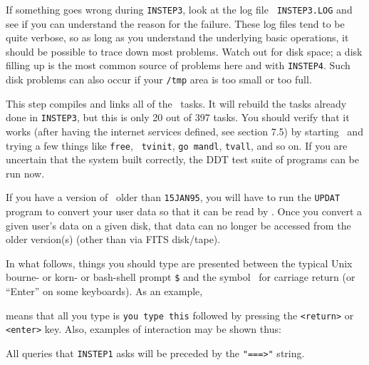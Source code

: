 If something goes wrong during {\tt INSTEP3}, look at the log file {\tt
INSTEP3.LOG} and see if you can understand the reason for the failure.
These log files tend to be quite verbose, so as long as you understand
the underlying basic operations, it should be possible to trace down
most problems.  Watch out for disk space; a disk filling up is the most
common source of problems here and with {\tt INSTEP4}.  Such disk
problems can also occur if your {\tt /tmp} area is too small or too
full.

\medskip{}

This step compiles and links all of the \aips\ tasks.  It will rebuild
the tasks already done in {\tt INSTEP3}, but this is only 20 out of
397 tasks.  You should verify that it works (after having the internet
services defined, see section 7.5)
by starting \ttaips\ and trying a few things like {\tt free}, {\tt
tvinit}, {\tt go mandl}, {\tt tvall}, and so on.  If you are uncertain
that the system built correctly, the DDT test suite of programs can be
run now.

If you have a version of \AIPS\ older than {\tt 15JAN95}, you will have
to run the {\tt UPDAT} program to convert your user data so that it can
be read by \THISVER.  Once you convert a given user's data on a given
disk, that data can no longer be accessed from the older version(s)
(other than via FITS disk/tape).

\bigskip


\vfill\eject%

In what follows, things you should type are presented between the
typical Unix bourne- or korn- or bash-shell prompt {\tt \$}
and the symbol \ret\ for carriage return (or ``Enter'' on some
keyboards).  As an example,
\medskip

\medskip

\noindent means that all you type is {\tt you type this} followed by
pressing the {\tt <return>} or {\tt <enter>} key.  Also, examples of
interaction may be shown thus:\medskip


\medskip\noindent All queries that {\tt INSTEP1} asks will be preceded
by the {\tt "===>"} string.

